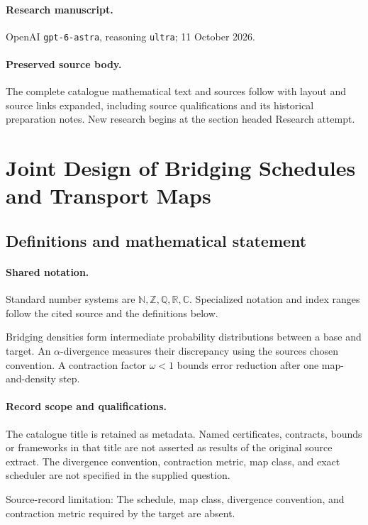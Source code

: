 \documentclass[11pt]{article}
\begin{document}
\paragraph{Research manuscript.} OpenAI \texttt{gpt-6-astra}, reasoning \texttt{ultra}; 11 October 2026.
\paragraph{Preserved source body.} The complete catalogue mathematical text and sources follow with layout and source links expanded, including source qualifications and its historical preparation notes. New research begins at the section headed Research attempt.

\section{Joint Design of Bridging Schedules and Transport Maps}\label{statement}

\subsection{Definitions and mathematical statement}

\paragraph{Shared notation.}Standard number systems are $\mathbb N,\mathbb Z,\mathbb Q,\mathbb R,\mathbb C$. Specialized notation and index ranges follow the cited source and the definitions below.


Bridging densities form intermediate probability distributions between a base and target. An $\alpha$-divergence measures their discrepancy using the source\textquotesingle s chosen convention. A contraction factor $\omega<1$ bounds error reduction after one map-and-density step.
\paragraph{Record scope and qualifications.}
The catalogue title is retained as metadata. Named certificates, contracts, bounds or frameworks in that title are not asserted as results of the original source extract.
The divergence convention, contraction metric, map class, and exact scheduler are not specified in the supplied question.

Source-record limitation: The schedule, map class, divergence convention, and contraction metric required by the target are absent.
\end{document}
